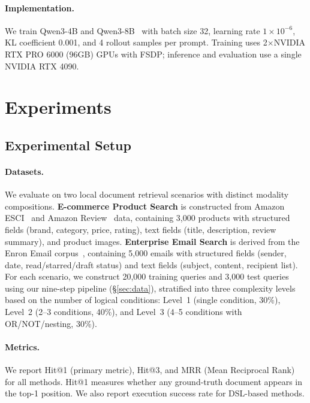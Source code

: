 \documentclass[11pt]{article}
\begin{document}
\paragraph{Implementation.}
We train Qwen3-4B and Qwen3-8B~\cite{yang2025qwen3} with batch size 32, learning rate $1 \times 10^{-6}$, KL coefficient 0.001, and 4 rollout samples per prompt.
Training uses 2$\times$NVIDIA RTX PRO 6000 (96GB) GPUs with FSDP; inference and evaluation use a single NVIDIA RTX 4090.


\section{Experiments}
\label{sec:experiments}

\subsection{Experimental Setup}
\label{sec:setup}

\paragraph{Datasets.}
We evaluate on two local document retrieval scenarios with distinct modality compositions.
\textbf{E-commerce Product Search} is constructed from Amazon ESCI~\cite{reddy2022shopping} and Amazon Review~\cite{ni2019justifying} data, containing 3{,}000 products with structured fields (brand, category, price, rating), text fields (title, description, review summary), and product images.
\textbf{Enterprise Email Search} is derived from the Enron Email corpus~\cite{klimt2004enron}, containing 5{,}000 emails with structured fields (sender, date, read/starred/draft status) and text fields (subject, content, recipient list).
For each scenario, we construct 20{,}000 training queries and 3{,}000 test queries using our nine-step pipeline (\S\ref{sec:data}), stratified into three complexity levels based on the number of logical conditions: Level~1 (single condition, 30\%), Level~2 (2--3 conditions, 40\%), and Level~3 (4--5 conditions with OR/NOT/nesting, 30\%).

\paragraph{Metrics.}
We report Hit@1 (primary metric), Hit@3, and MRR (Mean Reciprocal Rank) for all methods. Hit@1 measures whether any ground-truth document appears in the top-1 position. We also report execution success rate for DSL-based methods.
\end{document}

